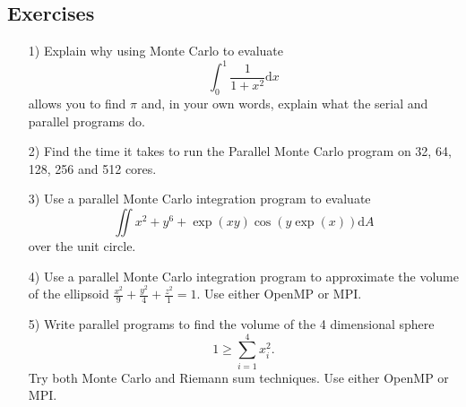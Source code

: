 \subsection{Exercises}
\begin{enumerate}
\item[1)] Explain why using Monte Carlo to evaluate
$$\int_0^1\frac{1}{1+x^2}\mathrm{d}x$$
allows you to find $\pi$ and, in your own words, explain what the serial and parallel programs do.
\item[2)] Find the time it takes to run the Parallel Monte Carlo program on 32, 64, 128, 256 and 512 cores.
\item[3)] Use a parallel Monte Carlo integration program to evaluate
$$\iint x^2+y^6+\exp(xy)\cos(y\exp(x))\mathrm{d}A$$
over the unit circle.
\item[4)] Use a parallel Monte Carlo integration program to approximate the volume of the ellipsoid $\frac{x^2}{9}+\frac{y^2}{4}+
  \frac{z^2}{1}=1$. Use either OpenMP or MPI.
\item[5)] Write parallel programs to find the volume of the 4 dimensional sphere 
$$1\geq\sum_{i=1}^4 x_i^2.$$
Try both Monte Carlo and Riemann sum techniques. Use either OpenMP or MPI.
\end{enumerate}

